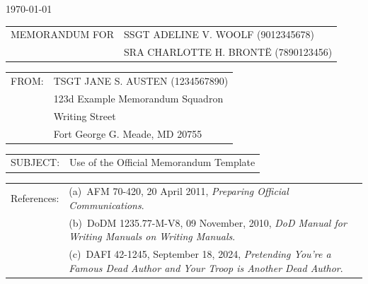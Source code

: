 \documentclass[12pt]{article}
\newlength{\baseSpaceLength}
\newcommand{\spaceLength}[1]{\dimexpr #1\baseSpaceLength\relax} %
\newcommand{\setcolumnwidth}[2]{
    \newlength{#1}%
    \settowidth{#1}{#2}%
    \addtolength{#1}{\spaceLength{2}} %
}
\begin{document}
\pagestyle{default}
\thispagestyle{firstpage}
\RaggedRight

\noindent\hfill\DTG\today

\setcolumnwidth{\memoWidth}{MEMORANDUM FOR}
\noindent
\begin{tabularx}{\textwidth}{@{} p{\memoWidth} @{} >{\RaggedRight}X @{}}
MEMORANDUM FOR & SSGT ADELINE V. WOOLF (9012345678)\\
               & SRA CHARLOTTE H. BRONTË (7890123456)\\
\end{tabularx}

\setcolumnwidth{\fromWidth}{FROM:}
\noindent
\begin{tabularx}{\textwidth}{@{} p{\fromWidth} @{} >{\RaggedRight}X @{}}
FROM: & TSGT JANE S. AUSTEN (1234567890)\\
      & 123d Example Memorandum Squadron\\
      & 4567 Writing Street\\
      & Fort George G. Meade, MD 20755\\
\end{tabularx}

\setcolumnwidth{\subjectWidth}{SUBJECT:}
\noindent
\begin{tabularx}{\textwidth}{@{} p{\subjectWidth} @{} >{\RaggedRight}X @{}}
SUBJECT: & Use of the Official Memorandum Template\\
\end{tabularx}

\setcolumnwidth{\referencesWidth}{References:}
\noindent
\begin{tabularx}{\textwidth}{@{} p{} @{} >{\RaggedRight}X @{}}
References: & (a)~AFM 70-420, 20 April 2011, \textit{Preparing Official Communications}.\\
            & (b)~DoDM 1235.77-M-V8, 09 November, 2010, \textit{DoD Manual for Writing Manuals on Writing Manuals}.\\
            & (c)~DAFI 42-1245, September 18, 2024, \textit{Pretending You're a Famous Dead Author and Your Troop is Another Dead Author}.\\
\end{tabularx}
\end{document}
